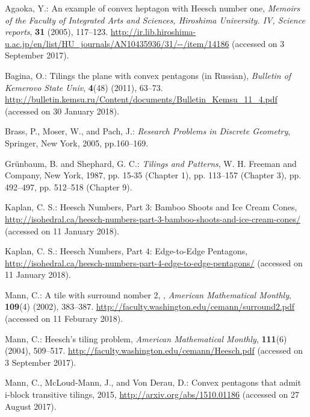 \documentclass[11pt, a4paper]{article}
\begin{document}
\begin{thebibliography}{99}
{\small





Agaoka, Y.: An example of convex heptagon with Heesch number one, 
\textit{Memoirs of the Faculty of Integrated Arts and Sciences, Hiroshima 
University. IV, Science reports}, \textbf{31} (2005), 117--123. 
\url{http://ir.lib.hiroshima-u.ac.jp/en/list/HU_journals/AN10435936/31/--/item/14186} 
(accessed on 3 September 2017).

Bagina, O.: Tilings the plane with convex pentagons (in Russian),  
\textit{Bulletin of Kemerovo State Univ}, \textbf{4}(48) (2011), 63--73.
\url{http://bulletin.kemsu.ru/Content/documents/Bulletin_Kemsu_11_4.pdf} 
(accessed on 30 January 2018).

Brass, P., Moser, W., and Pach, J.:  
\textit{Research Problems in Discrete Geometry}, Springer, New York, 
2005, pp.160--169.

Gr\"{u}nbaum, B. and Shephard, G. C.: \textit{Tilings and Patterns}, 
W. H. Freeman and Company, New York, 1987, 
pp. 15-35 (Chapter 1), pp. 113--157 (Chapter 3), pp. 492--497, pp. 512--518 (Chapter 9).

Kaplan, C. S.: Heesch Numbers, Part 3: Bamboo Shoots and Ice Cream Cones, 
\url{http://isohedral.ca/heesch-numbers-part-3-bamboo-shoots-and-ice-cream-cones/} 
(accessed on 11 January 2018).

Kaplan, C. S.: Heesch Numbers, Part 4: Edge-to-Edge Pentagons, 
\url{http://isohedral.ca/heesch-numbers-part-4-edge-to-edge-pentagons/} 
(accessed on 11 January 2018).

Mann, C.: A tile with surround nomber 2, , \textit{American Mathematical Monthly}, 
\textbf{109}(4) (2002), 383--387.
\url{http://faculty.washington.edu/cemann/surround2.pdf} 
(accessed on 11 Feburary 2018).


Mann, C.: Heesch's tiling problem, \textit{American Mathematical Monthly}, 
\textbf{111}(6) (2004), 509--517. 
\url{http://faculty.washington.edu/cemann/Heesch.pdf} 
(accessed on 3 September 2017).

Mann, C., McLoud-Mann, J., and Von Derau, D.: Convex pentagons that 
admit i-block transitive tilings, 2015, \url{http://arxiv.org/abs/1510.01186} 
(accessed on 27 August 2017). 

}
\end{thebibliography}
\end{document}

